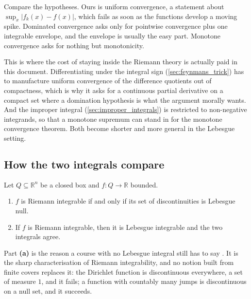 \begin{remark}
\label{rem:why_dominated_convergence_matters}
Compare the hypotheses. Ours is uniform convergence, a statement about $\sup_x\lvert f_k(x)-f(x)
\rvert$, which fails as soon as the functions develop a moving spike. Dominated convergence asks
only for pointwise convergence plus one integrable envelope, and the envelope is usually the easy
part. Monotone convergence asks for nothing but monotonicity.

This is where the cost of staying inside the Riemann theory is actually paid in this document.
Differentiating under the integral sign (\cref{sec:feynmans_trick}) has to manufacture uniform
convergence of the difference quotients out of compactness, which is why it asks for a continuous
partial derivative on a compact set where a domination hypothesis is what the argument morally
wants. And the improper integral (\cref{sec:improper_integrals}) is restricted to non-negative
integrands, so that a monotone supremum can stand in for the monotone convergence theorem. Both
become shorter and more general in the Lebesgue setting.
\end{remark}

\subsection{How the two integrals compare}

\begin{theorem}
\label{thm:lebesgue_criterion_riemann}
Let $Q \subseteq \mathbb{R}^n$ be a closed box and $f : Q \to \mathbb{R}$ bounded.
\begin{enumerate}[label=\textbf{(\alph*)}]
  \item $f$ is Riemann integrable if and only if its set of discontinuities is Lebesgue null.
  \item If $f$ is Riemann integrable, then it is Lebesgue integrable and the two integrals agree.
\end{enumerate}
\end{theorem}

Part \textbf{(a)} is the reason a course with no Lebesgue integral still has to say
. It is the sharp characterisation of Riemann integrability, and no notion built
from finite covers replaces it: the Dirichlet function is discontinuous everywhere, a set of
measure $1$, and it fails; a function with countably many jumps is discontinuous on a null set, and
it succeeds.

